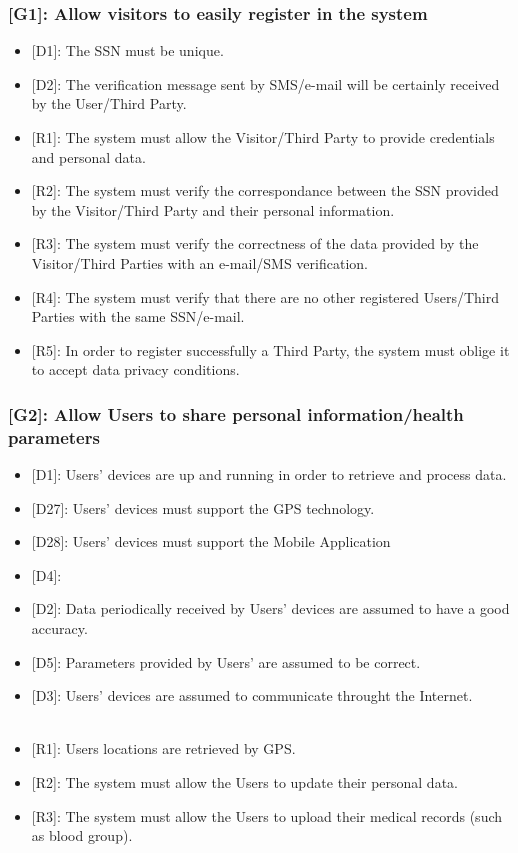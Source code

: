 \documentclass[12pt,a4paper]{article}
\begin{document}
	\subsubsection*{{[}{G1}{]}: Allow visitors to easily register in the system}
	\begin{itemize}
			\begin{itemize}
					\item {[D1]}: The SSN must be unique.
					\item {[D2]}: The verification message sent by SMS/e-mail will be certainly received by the User/Third Party.
					\\
					\item {[R1]}: The system must allow the Visitor/Third Party to provide credentials and personal data.
					\item {[R2]}: The system must verify the correspondance between the SSN provided by the Visitor/Third Party and their personal information.
					\item {[R3]}: The system must verify the correctness of the data provided by the Visitor/Third Parties with an e-mail/SMS verification.
					\item {[R4]}: The system must verify that there are no other registered Users/Third Parties with the same SSN/e-mail.
					\item {[R5]}: In order to register successfully a Third Party, the system must oblige it to accept data privacy conditions.
			\end{itemize} 
	\end{itemize}
	\subsubsection*{{[}{G2}{]}: Allow Users to share personal information/health parameters}
	\begin{itemize}
		\begin{itemize}
			\item {[D1]}: Users' devices are up and running in order to retrieve and process data.
			\item {[D27]}: Users' devices must support the GPS technology.
			\item {[D28]}: Users' devices must support the Mobile Application
			\item {[D4]}: 
			\item {[D2]}: Data periodically received by Users' devices are assumed to have a good accuracy. 
			\item {[D5]}: Parameters provided by Users' are assumed to be correct. 
			\item {[D3]}: Users' devices are assumed to communicate throught the Internet.
			\\\\
			\item {[R1]}: Users locations are retrieved by GPS.
			\item {[R2]}: The system must allow the Users to update their personal data.
			\item {[R3]}: The system must allow the Users to upload their medical records (such as blood group).
		\end{itemize} 
	\end{itemize}
\end{document}
